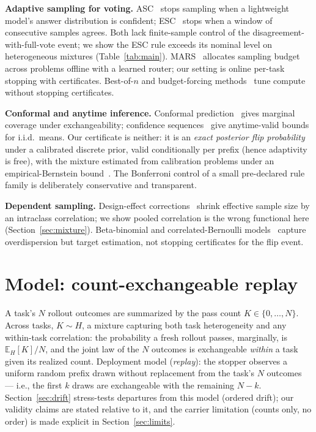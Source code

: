 \documentclass{article}
\theoremstyle{definition}
\theoremstyle{remark}
\newcommand{\E}{\mathbb{E}}
\begin{document}
\textbf{Adaptive sampling for voting.} ASC~\citep{aggarwal2023asc} stops
sampling when a lightweight model's answer distribution is confident;
ESC~\citep{li2024esc} stops when a window of consecutive samples agrees. Both
lack finite-sample control of the disagreement-with-full-vote event; we show
the ESC rule exceeds its nominal level on heterogeneous mixtures
(Table~\ref{tab:main}). MARS~\citep{chen2026mars} allocates sampling budget
across problems offline with a learned router; our setting is online per-task
stopping with certificates. Best-of-$n$ and budget-forcing
methods~\citep{snell2024scaling} tune compute without stopping certificates.

\textbf{Conformal and anytime inference.} Conformal
prediction~\citep{vovk2005algorithmic} gives marginal coverage under
exchangeability; confidence sequences~\citep{howard2021cs} give anytime-valid
bounds for i.i.d.\ means. Our certificate is neither: it is an \emph{exact
posterior flip probability} under a calibrated discrete prior, valid
conditionally per prefix (hence adaptivity is free), with the mixture
estimated from calibration problems under an empirical-Bernstein
bound~\citep{maurer2009eb}. The Bonferroni control of a small pre-declared
rule family is deliberately conservative and transparent.

\textbf{Dependent sampling.} Design-effect corrections~\citep{kish1965deff}
shrink effective sample size by an intraclass correlation; we show pooled
correlation is the wrong functional here (Section~\ref{sec:mixture}).
Beta-binomial and correlated-Bernoulli
models~\citep{skellam1948betabinomial} capture overdispersion but target
estimation, not stopping certificates for the flip event.

\section{Model: count-exchangeable replay}
\label{sec:model}

A task's $N$ rollout outcomes are summarized by the pass count
$K\in\{0,\dots,N\}$. Across tasks, $K\sim H$, a mixture capturing both
task heterogeneity and any within-task correlation: the probability a fresh
rollout passes, marginally, is $\E_H[K]/N$, and the joint law of the $N$
outcomes is exchangeable \emph{within} a task given its realized count.
Deployment model (\emph{replay}): the stopper observes a uniform random
prefix drawn without replacement from the task's $N$ outcomes --- i.e., the
first $k$ draws are exchangeable with the remaining $N-k$.
Section~\ref{sec:drift} stress-tests departures from this model (ordered
drift); our validity claims are stated relative to it, and the carrier
limitation (counts only, no order) is made explicit in
Section~\ref{sec:limits}.
\end{document}
